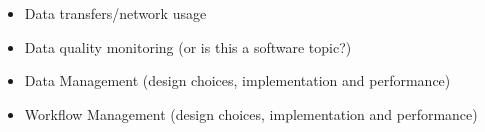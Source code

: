 \begin{itemize}


\item Data transfers/network usage





\item Data quality monitoring (or is this a software topic?)


\item Data Management (design choices, implementation and performance)


\item Workflow Management (design choices, implementation and performance)


\end{itemize}
